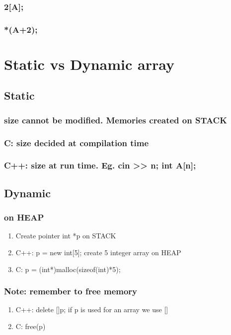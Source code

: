 \documentclass{article}
\begin{document}
\subsubsection{2[A];}
\label{sec:org878a616}
\subsubsection{*(A+2);}
\label{sec:org49bbe17}
\section{Static vs Dynamic array}
\label{sec:org8b58cba}
\subsection{Static}
\label{sec:orgb49acc7}
\subsubsection{size cannot be modified.  Memories created on STACK}
\label{sec:org5452ab0}
\subsubsection{C: size decided at compilation time}
\label{sec:org6c99163}
\subsubsection{C++: size at run time. Eg. cin >> n; int A[n];}
\label{sec:org2db8f53}
\subsection{Dynamic}
\label{sec:org0c7c02a}
\subsubsection{on HEAP}
\label{sec:org0124f25}
\begin{enumerate}
\item Create pointer int *p on STACK
\label{sec:org73d848c}
\item C++: p = new int[5]; create 5 integer array on HEAP
\label{sec:org416b901}
\item C: p = (int*)malloc(sizeof(int)*5);
\label{sec:org5a31ef0}
\end{enumerate}
\subsubsection{Note: remember to free memory}
\label{sec:orgf444346}
\begin{enumerate}
\item C++: delete []p; if p is used for an array we use []
\label{sec:orgc84efc5}
\item C: free(p)
\label{sec:org8d3fc56}
\end{enumerate}
\end{document}
